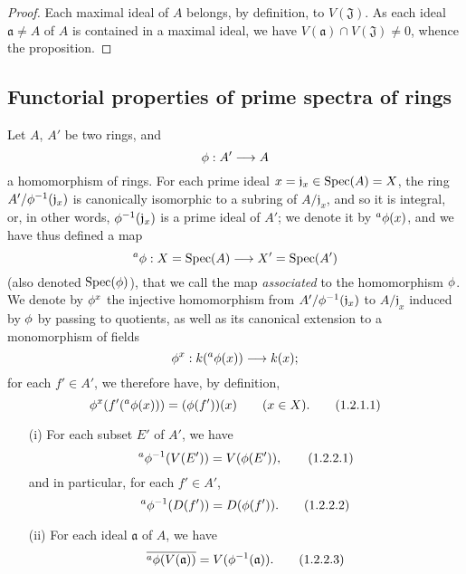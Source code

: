 \begin{proof}
\label{proof-I.1.1.15}
Each maximal ideal of $A$ belongs, by definition, to $V(\mathfrak{J})$.
As each ideal $\mathfrak{a}\neq A$ of $A$ is contained in a maximal ideal, we have $V(\mathfrak{a})\cap V(\mathfrak{J})\neq 0$, whence the proposition.
\end{proof}

\subsection{Functorial properties of prime spectra of rings}
\label{subsection:I.1.2}

\begin{env}[1.2.1]
\label{I.1.2.1}
Let $A$, $A'$ be two rings, and
\[
  \vphi:A'\to A
\]
a homomorphism of rings.
For each prime ideal $x=\mathfrak{j}_x\in\operatorname{Spec}(A)=X$, the ring $A'/\phi^{-1}(\mathfrak{j}_x)$ is canonically isomorphic to a subring of $A/\mathfrak{j}_x$, and so it is integral, or, in other words, $\phi^{-1}(\mathfrak{j}_x)$ is a prime ideal of $A'$;
we denote it by ${}^a\phi(x)$, and we have thus defined a map
\[
  {}^a\vphi:X=\Spec(A)\to X'=\Spec(A')
\]
(also denoted $\operatorname{Spec}(\phi)$), that we call the map \emph{associated} to the homomorphism $\phi$.
We denote by $\phi^x$ the injective homomorphism from $A'/\phi^{-1}(\mathfrak{j}_x)$ to $A/\mathfrak{j}_x$ induced by $\phi$ by passing to quotients, as well as its canonical extension to a monomorphism of fields
\[
  \vphi^x:\kres({}^a\vphi(x))\to\kres(x);
\]
\erratum[II]{}
for each $f'\in A'$, we therefore have, by definition,
\[
  \phi^x(f'({}^a\phi(x)))=(\phi(f'))(x)\qquad(x\in X).
  \tag{1.2.1.1}
\]
\end{env}

\begin{proposition}[1.2.2]
\label{I.1.2.2}
\medskip\noindent
\begin{enumerate}
  \item[{\rm(i)}] For each subset $E'$ of $A'$, we have
    \[
    \label{I.1.2.2.1}
      {}^a\phi^{-1}(V(E'))=V(\phi(E')),
      \tag{1.2.2.1}
    \]
    and in particular, for each $f'\in A'$,
    \[
    \label{I.1.2.2.2}
      {}^a\phi^{-1}(D(f'))=D(\phi(f')).
      \tag{1.2.2.2}
    \]
  \item[{\rm(ii)}] For each ideal $\mathfrak{a}$ of $A$, we have
    \[
    \label{I.1.2.2.3}
      \overline{{}^a\phi(V(\mathfrak{a}))}=V(\phi^{-1}(\mathfrak{a})).
      \tag{1.2.2.3}
    \]
\end{enumerate}
\end{proposition}

